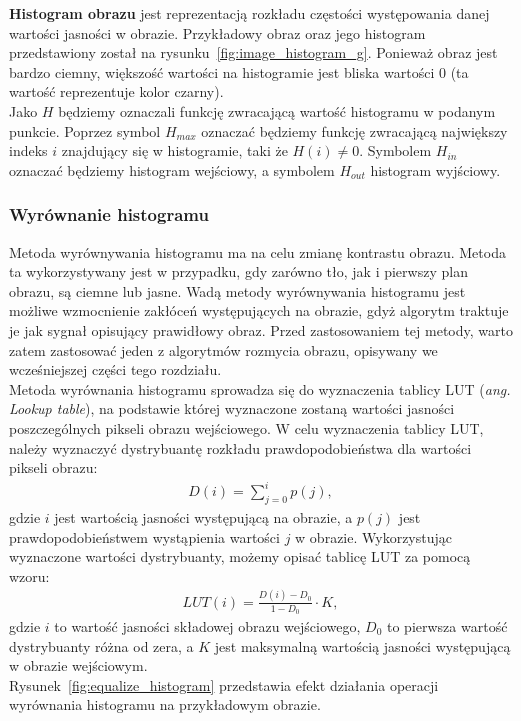 \textbf{Histogram obrazu} jest reprezentacją rozkładu częstości występowania danej wartości jasności w obrazie. Przykładowy obraz oraz jego histogram przedstawiony został na rysunku~\ref{fig:image_histogram_g}. Ponieważ obraz jest bardzo ciemny, większość wartości na histogramie jest bliska wartości 0 (ta wartość reprezentuje kolor czarny).\\
Jako $H$ będziemy oznaczali funkcję zwracającą wartość histogramu w podanym punkcie. Poprzez symbol $H_{max}$ oznaczać będziemy funkcję zwracającą największy indeks $i$ znajdujący się w histogramie, taki że $H(i) \neq 0$. Symbolem $H_{in}$ oznaczać będziemy histogram wejściowy, a symbolem $H_{out}$ histogram wyjściowy.\\

\subsubsection{Wyrównanie histogramu}
Metoda wyrównywania histogramu ma na celu zmianę kontrastu obrazu. Metoda ta wykorzystywany jest w przypadku, gdy zarówno tło, jak i pierwszy plan obrazu, są ciemne lub jasne. Wadą metody wyrównywania histogramu jest możliwe wzmocnienie zakłóceń występujących na obrazie, gdyż algorytm traktuje je jak sygnał opisujący prawidłowy obraz. Przed zastosowaniem tej metody, warto zatem zastosować jeden z algorytmów rozmycia obrazu, opisywany we wcześniejszej części tego rozdziału.\\
Metoda wyrównania histogramu sprowadza się do wyznaczenia tablicy LUT (\textit{ang. Lookup table}), na podstawie której wyznaczone zostaną wartości jasności poszczególnych pikseli obrazu wejściowego. W celu wyznaczenia tablicy LUT, należy wyznaczyć dystrybuantę rozkładu prawdopodobieństwa dla wartości pikseli obrazu:
\begin{gather*}
  D(i) = \sum\limits_{j=0}^i p(j),
\end{gather*}
gdzie $i$ jest wartością jasności występującą na obrazie, a $p(j)$ jest prawdopodobieństwem wystąpienia wartości $j$ w obrazie. Wykorzystując wyznaczone wartości dystrybuanty, możemy opisać tablicę LUT za pomocą wzoru:
\begin{gather*}
  LUT(i) = \frac{D(i)-D_0}{1-D_0} \cdot K,
\end{gather*}
gdzie $i$ to wartość jasności składowej obrazu wejściowego, $D_0$ to pierwsza wartość dystrybuanty różna od zera, a $K$ jest maksymalną wartością jasności występującą w obrazie wejściowym.\\
Rysunek~\ref{fig:equalize_histogram} przedstawia efekt działania operacji wyrównania histogramu na przykładowym obrazie.
